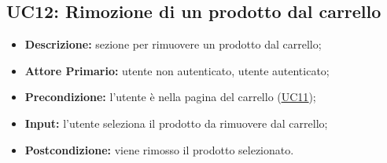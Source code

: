 
\subsection{UC12: Rimozione di un prodotto dal carrello}
\label{sec:UC12}
\begin{itemize}
    \item \textbf{Descrizione:} sezione per rimuovere un prodotto dal carrello;
    \item \textbf{Attore Primario:} utente non autenticato, utente autenticato;
    \item \textbf{Precondizione:} l'utente è nella pagina del carrello (\hyperref[sec:UC11]{\underline{UC11}});
    \item \textbf{Input:} l'utente seleziona il prodotto da rimuovere dal carrello;
    \item \textbf{Postcondizione:} viene rimosso il prodotto selezionato.
\end{itemize}